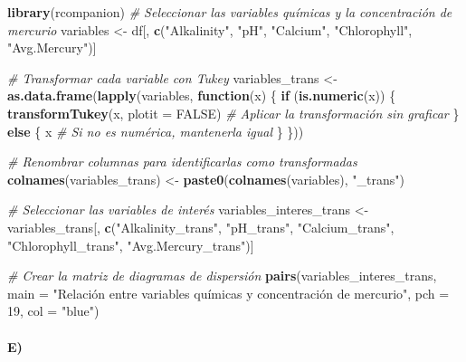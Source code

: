 \documentclass[
]{article}
\newenvironment{Shaded}{\begin{snugshade}}{\end{snugshade}}
\newcommand{\AttributeTok}[1]{\textcolor[rgb]{0.13,0.29,0.53}{#1}}
\newcommand{\CommentTok}[1]{\textcolor[rgb]{0.56,0.35,0.01}{\textit{#1}}}
\newcommand{\ConstantTok}[1]{\textcolor[rgb]{0.56,0.35,0.01}{#1}}
\newcommand{\ControlFlowTok}[1]{\textcolor[rgb]{0.13,0.29,0.53}{\textbf{#1}}}
\newcommand{\DecValTok}[1]{\textcolor[rgb]{0.00,0.00,0.81}{#1}}
\newcommand{\FunctionTok}[1]{\textcolor[rgb]{0.13,0.29,0.53}{\textbf{#1}}}
\newcommand{\NormalTok}[1]{#1}
\newcommand{\OtherTok}[1]{\textcolor[rgb]{0.56,0.35,0.01}{#1}}
\newcommand{\StringTok}[1]{\textcolor[rgb]{0.31,0.60,0.02}{#1}}
\begin{document}
\begin{Shaded}
\begin{Highlighting}[]
\FunctionTok{library}\NormalTok{(rcompanion)}
\CommentTok{\# Seleccionar las variables químicas y la concentración de mercurio}
\NormalTok{variables }\OtherTok{\textless{}{-}}\NormalTok{ df[, }\FunctionTok{c}\NormalTok{(}\StringTok{"Alkalinity"}\NormalTok{, }\StringTok{"pH"}\NormalTok{, }\StringTok{"Calcium"}\NormalTok{, }\StringTok{"Chlorophyll"}\NormalTok{, }\StringTok{"Avg.Mercury"}\NormalTok{)]}

\CommentTok{\# Transformar cada variable con Tukey}
\NormalTok{variables\_trans }\OtherTok{\textless{}{-}} \FunctionTok{as.data.frame}\NormalTok{(}\FunctionTok{lapply}\NormalTok{(variables, }\ControlFlowTok{function}\NormalTok{(x) \{}
  \ControlFlowTok{if}\NormalTok{ (}\FunctionTok{is.numeric}\NormalTok{(x)) \{}
    \FunctionTok{transformTukey}\NormalTok{(x, }\AttributeTok{plotit =} \ConstantTok{FALSE}\NormalTok{)  }\CommentTok{\# Aplicar la transformación sin graficar}
\NormalTok{  \} }\ControlFlowTok{else}\NormalTok{ \{}
\NormalTok{    x  }\CommentTok{\# Si no es numérica, mantenerla igual}
\NormalTok{  \}}
\NormalTok{\}))}

\CommentTok{\# Renombrar columnas para identificarlas como transformadas}
\FunctionTok{colnames}\NormalTok{(variables\_trans) }\OtherTok{\textless{}{-}} \FunctionTok{paste0}\NormalTok{(}\FunctionTok{colnames}\NormalTok{(variables), }\StringTok{"\_trans"}\NormalTok{)}

\CommentTok{\# Seleccionar las variables de interés}
\NormalTok{variables\_interes\_trans }\OtherTok{\textless{}{-}}\NormalTok{ variables\_trans[, }\FunctionTok{c}\NormalTok{(}\StringTok{"Alkalinity\_trans"}\NormalTok{, }\StringTok{"pH\_trans"}\NormalTok{, }\StringTok{"Calcium\_trans"}\NormalTok{, }\StringTok{"Chlorophyll\_trans"}\NormalTok{, }\StringTok{"Avg.Mercury\_trans"}\NormalTok{)]}

\CommentTok{\# Crear la matriz de diagramas de dispersión}
\FunctionTok{pairs}\NormalTok{(variables\_interes\_trans, }\AttributeTok{main =} \StringTok{"Relación entre variables químicas y concentración de mercurio"}\NormalTok{,}
      \AttributeTok{pch =} \DecValTok{19}\NormalTok{, }\AttributeTok{col =} \StringTok{"blue"}\NormalTok{)}
\end{Highlighting}
\end{Shaded}

\hypertarget{e-2}{%
\paragraph{E)}\label{e-2}}
\end{document}
